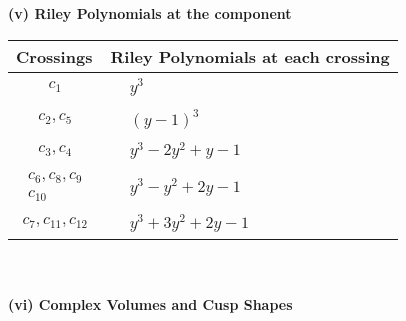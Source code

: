 \documentclass[1p]{elsarticle_modified}
\theoremstyle{definition}
\begin{document}
\newpage\renewcommand{\arraystretch}{1}
\flushleft \textbf{(v) Riley Polynomials at the component}\newline \\
\begin{tabular}{m{50pt}|m{274pt}}
Crossings & \hspace{64pt}Riley Polynomials at each crossing \\
\hline $$\begin{aligned}c_{1}\end{aligned}$$&$\begin{aligned}
&y^3
\end{aligned}$\\
\hline $$\begin{aligned}c_{2},c_{5}\end{aligned}$$&$\begin{aligned}
&(y-1)^3
\end{aligned}$\\
\hline $$\begin{aligned}c_{3},c_{4}\end{aligned}$$&$\begin{aligned}
&y^3-2 y^2+y-1
\end{aligned}$\\
\hline $$\begin{aligned}c_{6},c_{8},c_{9}\\c_{10}\end{aligned}$$&$\begin{aligned}
&y^3- y^2+2 y-1
\end{aligned}$\\
\hline $$\begin{aligned}c_{7},c_{11},c_{12}\end{aligned}$$&$\begin{aligned}
&y^3+3 y^2+2 y-1
\end{aligned}$\\
\hline
\end{tabular}\\~\\
\newpage\flushleft \textbf{(vi) Complex Volumes and Cusp Shapes}
\end{document}
